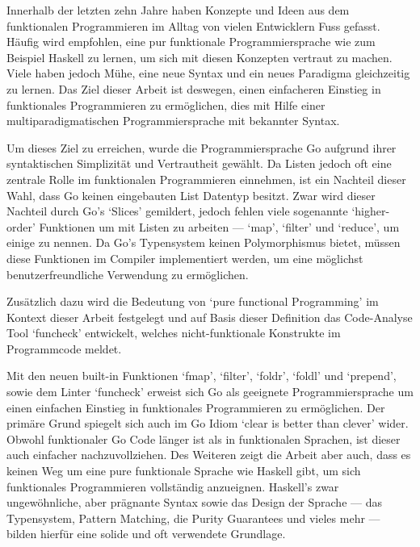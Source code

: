 
Innerhalb der letzten zehn Jahre haben Konzepte und Ideen aus dem funktionalen
Programmieren im Alltag von vielen Entwicklern Fuss gefasst. Häufig wird
empfohlen, eine pur funktionale Programmiersprache wie zum Beispiel Haskell
zu lernen, um sich mit diesen Konzepten vertraut zu machen. Viele haben jedoch
Mühe, eine neue Syntax und ein neues Paradigma gleichzeitig zu lernen. Das Ziel
dieser Arbeit ist deswegen, einen einfacheren Einstieg in funktionales Programmieren
zu ermöglichen, dies mit Hilfe einer multiparadigmatischen Programmiersprache mit bekannter
Syntax.

Um dieses Ziel zu erreichen, wurde die Programmiersprache Go aufgrund ihrer
syntaktischen Simplizität und Vertrautheit gewählt.
Da Listen jedoch oft eine zentrale Rolle im funktionalen Programmieren einnehmen, ist ein
Nachteil dieser Wahl, dass Go keinen eingebauten List Datentyp besitzt. Zwar wird
dieser Nachteil durch Go's `Slices' gemildert, jedoch fehlen viele sogenannte `higher-order'
Funktionen um mit Listen zu arbeiten --- `map', `filter' und `reduce', um einige zu nennen.
Da Go's Typensystem keinen Polymorphismus bietet, müssen diese Funktionen im Compiler
implementiert werden, um eine möglichst benutzerfreundliche Verwendung zu ermöglichen.

Zusätzlich dazu wird die Bedeutung von `pure functional Programming' im Kontext dieser Arbeit
festgelegt und auf Basis dieser Definition das Code-Analyse Tool `funcheck' entwickelt, welches
nicht-funktionale Konstrukte im Programmcode meldet.

Mit den neuen built-in Funktionen `fmap', `filter', `foldr', `foldl' und `prepend',
sowie dem Linter `funcheck' erweist sich Go als geeignete Programmiersprache um
einen einfachen Einstieg in funktionales Programmieren zu ermöglichen. Der primäre Grund
spiegelt sich auch im Go Idiom `clear is better than clever' wider. Obwohl funktionaler
Go Code länger ist als in funktionalen Sprachen, ist dieser auch einfacher nachzuvollziehen.
Des Weiteren zeigt die Arbeit aber auch, dass es keinen Weg um eine pure funktionale Sprache
wie Haskell gibt, um sich funktionales Programmieren vollständig anzueignen.
Haskell's zwar ungewöhnliche, aber prägnante Syntax sowie das Design
der Sprache --- das Typensystem, Pattern Matching, die Purity Guarantees und vieles mehr ---
bilden hierfür eine solide und oft verwendete Grundlage.
